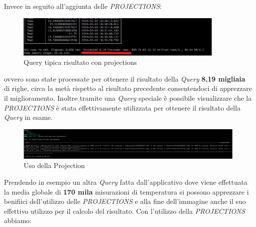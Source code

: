       Invece in seguito all'aggiunta delle \textit{PROJECTIONS}:
      \begin{figure}[H]
        \centering
        \includegraphics[width=0.9\textwidth]{../Images/SpecificaTecnica/ConProjectionRisultato.jpg}
        \caption{Query tipica risultato con projections}
        \label{fig:ProjectionsQueryWith}
      \end{figure}   
  ovvero sono state processate per ottenere il risultato della \textit{Query} \textbf{8,19 migliaia} di righe, circa la metà rispetto al risultato precedente consentendoci di apprezzare il miglioramento.
Inoltre tramite una \textit{Query} speciale è possibile visualizzare che la \textit{PROJECTIONS} è stata effettivamente utilizzata per ottenere il risultato della \textit{Query} in esame.
\begin{figure}[H]
    \centering
    \includegraphics[width=1\textwidth]{../Images/SpecificaTecnica/ProjectionUsedByClickHouse.jpg}
    \caption{Uso della Projection}
    \label{fig:ProjectionsUsed}
\end{figure}

Prendendo in esempio un altra \textit{Query} fatta dall'applicativo dove viene effettuata la media globale di \textbf{170 mila }misurazioni di temperatura si possono apprezzare i benifiici dell'utilizzo delle \textit{PROJECTIONS} e alla fine dell'immagine anche il suo effettivo utilizzo per il calcolo del risultato.
Con l'utilizzo della \textit{PROJECTIONS} abbiamo:
